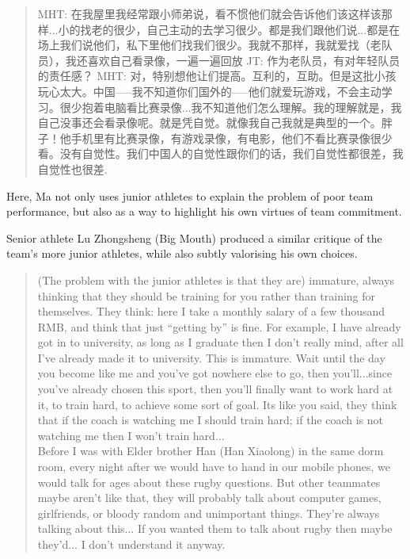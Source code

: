 \begin{CJK}{UTF8}{gbsn}
  \begin{quotation}
    MHT: 在我屋里我经常跟小师弟说，看不惯他们就会告诉他们该这样该那样...小的找老的很少，自己主动的去学习很少。都是我们跟他们说...都是在场上我们说他们，私下里他们找我们很少。我就不那样，我就爱找（老队员），我还喜欢自己看录像，一遍一遍回放
    JT: 作为老队员，有对年轻队员的责任感？
    MHT: 对，特别想他让们提高。互利的，互助。但是这批小孩玩心太大。中国—--我不知道你们国外的—--他们就爱玩游戏，不会主动学习。很少抱着电脑看比赛录像...我不知道他们怎么理解。我的理解就是，我自己没事还会看录像呢。就是凭自觉。就像我自己我就是典型的一个。胖子！他手机里有比赛录像，有游戏录像，有电影，他们不看比赛录像很少看。没有自觉性。我们中国人的自觉性跟你们的话，我们自觉性都很差，我自觉性也很差.
  \end{quotation}

Here, Ma not only uses junior athletes to explain the problem of poor team performance, but also as a way to highlight his own virtues of team commitment.

Senior athlete Lu Zhongsheng (Big Mouth) produced a similar critique of the team's more junior athletes, while also subtly valorising his own choices.

  \begin{quotation}
    (The problem with the junior athletes is that they are) immature, always thinking that they should be training for you rather than training for themselves.  They think: here I take a monthly salary of a few thousand RMB, and think that just ``getting by'' is fine.  For example, I have already got in to university, as long as I graduate then I don't really mind, after all I've already made it to university.  This is immature.  Wait until the day you become like me and you've got nowhere else to go, then you'll...since you've already chosen this sport, then you'll finally want to work hard at it, to train hard, to achieve some sort of goal.  Its like you said, they think that if the coach is watching me I should train hard; if the coach is not watching me then I won't train hard...\\

    Before I was with Elder brother Han (Han Xiaolong) in the same dorm room, every night after we would have to hand in our mobile phones, we would talk for ages about these rugby questions. But other teammates maybe aren't like that, they will probably talk about computer games, girlfriends, or bloody random and unimportant things.  They're always talking about this... If you wanted them to talk about rugby then maybe they'd... I don't understand it anyway.
  \end{quotation}


\end{CJK}
